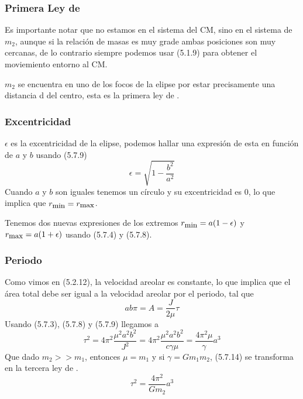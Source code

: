 \subsubsection{Primera Ley de }
Es importante notar que no estamos en el sistema del CM, sino en el sistema de $m_2$, aunque si la relación de masas es muy grade ambas posiciones son muy cercanas, de lo contrario siempre podemos usar (5.1.9) para obtener el moviemiento entorno al CM.

$m_2$ se encuentra en uno de los focos de la elipse por estar precisamente una distancia d del centro, esta es la primera ley de .

\subsubsection{Excentricidad}
$\epsilon$ es la excentricidad de la elipse, podemos hallar una expresión de esta en función de $a$ y $b$ usando (5.7.9)
\begin{equation} \label{5.1.12}
    \epsilon = \sqrt{1-\frac{b^2}{a^2}}
\end{equation} 
Cuando $a$ y $b$ son iguales tenemos un círculo y su excentricidad es 0, lo que implica que $r_{\mbox{\small min}} = r_{\mbox{\small max}}$.

Tenemos dos nuevas expresiones de los extremos $r_{\mbox{\small min}} = a (1-\epsilon) $ y  $r_{\mbox{\small max}} = a (1+\epsilon)$ usando (5.7.4) y (5.7.8).
\clearpage
\subsubsection{Periodo}
Como vimos en (5.2.12), la velocidad areolar es constante, lo que implica que el área total debe ser igual a la velocidad areolar por el periodo, tal que
\begin{equation} \label{5.1.13}
    a b \pi =A = \frac{J}{2 \mu} \tau
\end{equation} 
Usando (5.7.3), (5.7.8) y (5.7.9) llegamos a 
\begin{equation} \label{5.1.14}
    \tau^2 = 4 \pi^2 \frac{\mu^2 a^2 b^2}{J^2} = 4 \pi^2 \frac{\mu^2 a^2 b^2}{c \gamma \mu} =  \frac{4 \pi^2  \mu}{\gamma} a^3
\end{equation} 
Que dado $m_2 >> m_1$, entonces $\mu = m_1$ y si $\gamma = G m_1 m_2 $, (5.7.14) se transforma en la tercera ley de .
\begin{equation} \label{5.1.14}
    \tau^2 =\frac{4 \pi^2}{G m_2} a^3
\end{equation} 
